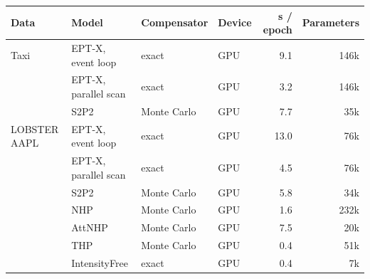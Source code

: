 \begin{tabular}{llllrr}
\toprule
Data & Model & Compensator & Device & s / epoch & Parameters \\
\midrule
\rowcolor{oursbg} Taxi & EPT-X, event loop & exact & GPU & 9.1 & 146k \\
\rowcolor{oursbg}  & EPT-X, parallel scan & exact & GPU & 3.2 & 146k \\
 & S2P2 & Monte Carlo & GPU & 7.7 & 35k \\
\midrule
\rowcolor{oursbg} LOBSTER AAPL & EPT-X, event loop & exact & GPU & 13.0 & 76k \\
\rowcolor{oursbg}  & EPT-X, parallel scan & exact & GPU & 4.5 & 76k \\
 & S2P2 & Monte Carlo & GPU & 5.8 & 34k \\
 & NHP & Monte Carlo & GPU & 1.6 & 232k \\
 & AttNHP & Monte Carlo & GPU & 7.5 & 20k \\
 & THP & Monte Carlo & GPU & 0.4 & 51k \\
 & IntensityFree & exact & GPU & 0.4 & 7k \\
\bottomrule
\end{tabular}